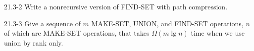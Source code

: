 \begin{problem}{21.3-2}
  Write a nonrecursive version of FIND-SET with path compression.
\end{problem}

\begin{problem}{21.3-3}
  Give a sequence of $m$ MAKE-SET, UNION, and FIND-SET operations, $n$ of which are MAKE-SET operations, that takes
  $\Omega(m \lg n)$ time when we use union by rank only.
\end{problem}


